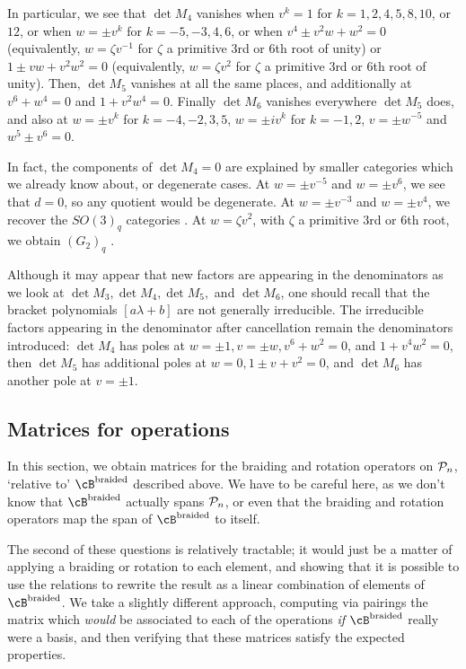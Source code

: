 \documentclass[12pt]{amsart}
\begin{document}
In particular, we see that $\det M_4$ vanishes when $v^k = 1$ for
$k=1,2,4,5,8,10$, or $12$, or when $w = \pm v^k$ for $k=-5,-3,4,6$, or when
$v^4 \pm v^2 w + w^2 = 0$ (equivalently, $w = \zeta v^{-1}$ for $\zeta$ a
primitive 3rd or 6th root of unity) or $1 \pm v w + v^2 w^2 = 0$
(equivalently, $w = \zeta v^2$ for $\zeta$ a primitive 3rd or 6th root of
unity). Then, $\det M_5$ vanishes at all the same places, and additionally at
$v^6 + w^4 = 0$ and $1 + v^2 w^4 = 0$.  Finally $\det M_6$ vanishes everywhere $\det
M_5$ does, and also at $w = \pm v^k$ for $k=-4,-2,3,5$, $w = \pm i v^k$ for
$k=-1,2$, $v = \pm w^{-5}$ and $w^5 \pm v^6 = 0$.

In fact, the components of $\det M_4 = 0$ are explained by smaller categories
which we already know about, or degenerate cases.  At $w = \pm v^{-5}$ and $w =
\pm v^6$, we see that $d=0$, so any quotient would be degenerate. At $w = \pm
v^{-3}$ and $w = \pm v^4$, we recover the $SO(3)_q$ categories .
At $w = \zeta v^2$, with $\zeta$ a primitive 3rd or 6th root, we obtain
$(G_2)_q$ . 

Although it may appear that new factors are appearing in the
denominators as we look at $\det M_3, \det M_4, \det M_5, $ and $\det
M_6$, one should recall that the bracket polynomials $[a \lambda + b]$
are not generally irreducible. The
irreducible factors appearing in the denominator after cancellation
remain the denominators  introduced: $\det M_4$ has poles
at $w=\pm1, v=\pm w, v^6+w^2 = 0$, and $1+v^4w^2 = 0$,
then $\det M_5$ has additional poles at $w=0, 1\pm v + v^2 = 0$, and $\det M_6$
has another pole at $v = \pm 1$.


\subsection{Matrices for operations}
In this section, we obtain matrices for the braiding and rotation operators on
 $\mathcal{P}_n$, `relative to' $\cB^{\text{braided}}$ described above.
We have to be careful here, as we don't know that $\cB^{\text{braided}}$
actually spans $\mathcal{P}_n$, or even that the braiding and rotation operators map
the span of $\cB^{\text{braided}}$ to itself.

The second of these questions is relatively tractable; it would just be a
matter of applying a braiding or rotation to each element, and showing that it
is possible to use the relations to rewrite the result as a linear combination
of elements of $\cB^{\text{braided}}$. We take a slightly different approach,
computing via pairings the matrix which \emph{would} be associated to each of the
operations \emph{if} $\cB^{\text{braided}}$ really were a basis, and then
verifying that these matrices satisfy the expected properties.
\end{document}
